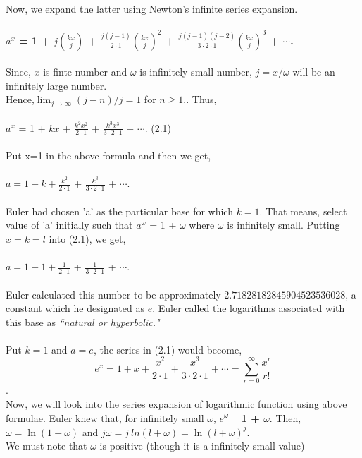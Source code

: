 \documentclass[a4paper,reqno,11pt]{book}
\theoremstyle{plain}%
\theoremstyle{definition}
\begin{document}
\noindent Now, we expand the latter using Newton's infinite series expansion.\\
\\
\textbf{$a^x$ = 1 + $j(\frac{kx}{j})$ + $\frac{j(j-1)}{2\cdot1}(\frac{kx}{j})^2$ + $\frac{j(j-1)(j-2)}{3\cdot2\cdot1}(\frac{kx}{j})^3$ + $\cdots$.}\\
\\
Since, $x$ is finte number and $\omega$ is infinitely small number, $j=x/\omega$ will be an infinitely large number.\\
Hence,$ \lim_{j\to\infty}(j-n)/j = 1$ for $n\geq1.$. Thus,\\
\\
\indent $a^x$ = 1 + $kx$ + $\frac{k^2x^2}{2\cdot1}$ +  $\frac{k^3x^3}{3\cdot2\cdot1}$  + $\cdots$. \hspace{2cm} (2.1)\\
\\
Put x=1 in the above formula and then we get,\\
\\
\indent $a = 1 + k + \frac{k^2}{2\cdot1}$ + $\frac{k^3}{3\cdot2\cdot1}$ + $\cdots$.\\
\\
Euler had chosen 'a' as the particular base 
for which $k = 1$. That means, select value of 'a' initially such that $a^\omega$ = 1 + $\omega$
where $\omega$ is infinitely small. Putting $x = k = l$ into (2.1), we get,
\\
\\
\indent $a = 1 + 1 + \frac{1}{2\cdot1}$ + $\frac{1}{3\cdot2\cdot1}$ + $\cdots$.\\
\\
\noindent Euler calculated this number to be approximately 
$2. 71828182845904523536028$, 
a constant which he designated as $e$. Euler called the logarithms associated with this base as \textit{``natural or hyperbolic."}\\ 
\\
Put $k = 1$ and $a = e$, the series in (2.1) would become,\\
$$ e^x = 1 + x + \frac{x^2}{2\cdot1} + \frac{x^3}{3\cdot2\cdot1} + \cdots = 
\sum_{r=0}^{\infty}\frac{x^r}{r!} $$.\\
Now, we will look into the series expansion of logarithmic function using above formulae. Euler knew that, for infinitely small $\omega$,
\textbf{$ e^\omega $ =1 + $\omega$}.
Then, $\omega =\ln(1+\omega)$ and $j\omega = j\ ln(l + \omega) = \ln(l + \omega )^j$. \\
We must note that $\omega$ is positive (though it is a infinitely small value)
\end{document}
